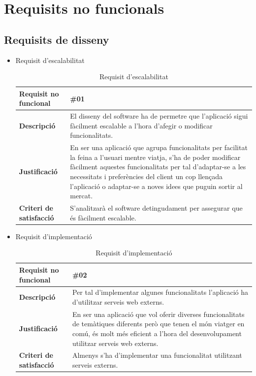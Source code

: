 \clearpage


\section{Requisits no funcionals}

\subsection{Requisits de disseny}
\begin{itemize}
\item{Requisit d'escalabilitat}

\begin{table}[!h]
\centering
\begin{tabular}{|l|M|}
\hline
\textbf{Requisit no funcional }& \#01    \\ \hline
\textbf{Descripció} &  El disseny del software ha de permetre que l’aplicació
sigui fàcilment escalable a l’hora d’afegir o modificar
funcionalitats.
 \\ \hline
\textbf{Justificació} & En ser una aplicació que agrupa funcionalitats per facilitat la feina a l’usuari mentre viatja, s’ha de poder modificar fàcilment aquestes funcionalitats per tal d’adaptar-se a les necessitats i preferències del client un cop llençada l’aplicació o adaptar-se a noves idees que puguin sortir al mercat.  \\ \hline
\textbf{Criteri de satisfacció} & S’analitzarà el software detingudament per assegurar que és fàcilment escalable.  \\ \hline
\end{tabular}
\label{}
\caption{Requisit d'escalabilitat}
\end{table}

\item{Requisit d'implementació}

\begin{table}[!h]
\centering
\begin{tabular}{|l|M|}
\hline
\textbf{Requisit no funcional }& \#02    \\ \hline
\textbf{Descripció} &  Per tal d’implementar algunes funcionalitats l’aplicació ha d’utilitzar serveis web externs. \\ \hline
\textbf{Justificació} & En ser una aplicació que vol oferir diverses funcionalitats de temàtiques diferents però que tenen el món
viatger en comú, és molt més eficient a l’hora del
desenvolupament utilitzar serveis web externs.  \\ \hline
\textbf{Criteri de satisfacció} & Almenys s’ha d’implementar una funcionalitat utilitzant serveis externs.
 \\ \hline
\end{tabular}
\label{}
\caption{Requisit d'implementació}
\end{table}

\end{itemize}


